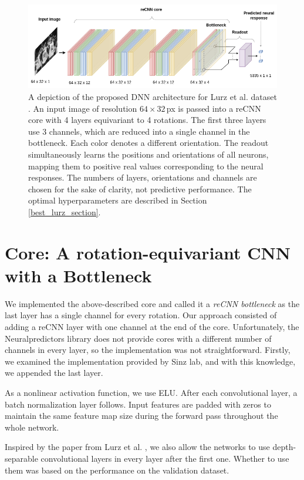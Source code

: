 \begin{figure}[H]\centering
	\includegraphics[width=145mm]{../img/architecture.png}
	\caption{A depiction of the proposed DNN architecture for Lurz et al. dataset \citep{lurz2021generalization}. An input image of resolution $64 \times 32$\,px is passed into a reCNN core with 4 layers equivariant to 4 rotations. The first three layers use 3 channels, which are reduced into a single channel in the bottleneck. Each color denotes a different orientation. The readout simultaneously learns the positions and orientations of all neurons, mapping them to positive real values corresponding to the neural responses. The numbers of layers, orientations and channels are chosen for the sake of clarity, not predictive performance. The optimal hyperparameters are described in Section \ref{best_lurz_section}.}
	\label{img_architecture}
\end{figure}

\section{Core: A rotation-equivariant CNN with a Bottleneck}

We implemented the above-described core and called it a \emph{reCNN bottleneck} as the last layer has a single channel for every rotation. Our approach consisted of adding a reCNN layer with one channel at the end of the core. Unfortunately, the Neuralpredictors library does not provide cores with a different number of channels in every layer, so the implementation was not straightforward. Firstly, we examined the implementation provided by Sinz lab, and with this knowledge, we appended the last layer.

As a nonlinear activation function, we use ELU. After each convolutional layer, a batch normalization layer follows. Input features are padded with zeros to maintain the same feature map size during the forward pass throughout the whole network.

Inspired by the paper from Lurz et al. \citep{lurz2021generalization}, we also allow the networks to use depth-separable convolutional layers \citep{chollet2017xception} in every layer after the first one. Whether to use them was based on the performance on the validation dataset.

